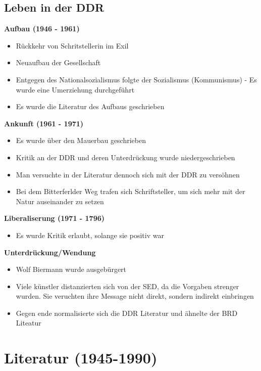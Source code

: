 \documentclass{article}
\begin{document}
\subsection{Leben in der DDR}
\textbf{Aufbau (1946 - 1961)}
\begin{itemize}[parsep=0pt]
    \item Rückkehr von Schritstellerin im Exil
    \item Neuaufbau der Gesellschaft
    \item Entgegen des Nationalsozialismus folgte der Sozialismus (Kommunismus) - Es wurde eine Umerziehung durchgeführt
    \item Es wurde die Literatur des Aufbaus geschrieben
\end{itemize}
\textbf{Ankunft (1961 - 1971)}
\begin{itemize}[parsep=0pt]
    \item Es wurde über den Mauerbau geschrieben
    \item Kritik an der DDR und deren Unterdrückung wurde niedergeschrieben
    \item Man versuchte in der Literatur dennoch sich mit der DDR zu versöhnen
    \item Bei dem Bitterferlder Weg trafen sich Schriftsteller, um sich mehr mit der Natur auseinander zu setzen
\end{itemize}
\textbf{Liberaliserung (1971 - 1796)}
\begin{itemize}
    \item Es wurde Kritik erlaubt, solange sie positiv war
\end{itemize}
\textbf{Unterdrückung/Wendung}
\begin{itemize}[parsep=0pt]
    \item Wolf Biermann wurde ausgebürgert
    \item Viele künstler distanzierten sich von der SED, da die Vorgaben strenger wurden. Sie veruchten ihre Message nicht direkt, sondern indirekt einbringen
    \item Gegen ende normalisierte sich die DDR Literatur und ähnelte der BRD Liteatur
\end{itemize}
\section{Literatur (1945-1990)}
\end{document}
